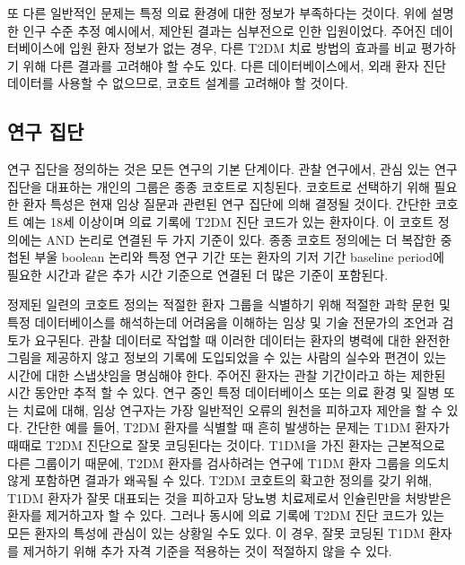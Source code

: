 \documentclass[10.5pt]{book}
\theoremstyle{definition}
\theoremstyle{definition}
\theoremstyle{definition}
\theoremstyle{remark}
\begin{document}
또 다른 일반적인 문제는 특정 의료 환경에 대한 정보가 부족하다는 것이다.
위에 설명한 인구 수준 추정 예시에서, 제안된 결과는 심부전으로 인한
입원이었다. 주어진 데이터베이스에 입원 환자 정보가 없는 경우, 다른 T2DM
치료 방법의 효과를 비교 평가하기 위해 다른 결과를 고려해야 할 수도 있다.
다른 데이터베이스에서, 외래 환자 진단 데이터를 사용할 수 없으므로,
코호트 설계를 고려해야 할 것이다.

\subsection{연구 집단}\label{--1}

연구 집단을 정의하는 것은 모든 연구의 기본 단계이다. 관찰 연구에서, 관심
있는 연구 집단을 대표하는 개인의 그룹은 종종 코호트로 지칭된다. 코호트로
선택하기 위해 필요한 환자 특성은 현재 임상 질문과 관련된 연구 집단에
의해 결정될 것이다. 간단한 코호트 예는 18세 이상이며 의료 기록에 T2DM
진단 코드가 있는 환자이다. 이 코호트 정의에는 AND 논리로 연결된 두 가지
기준이 있다. 종종 코호트 정의에는 더 복잡한 중첩된 부울 boolean 논리와
특정 연구 기간 또는 환자의 기저 기간 baseline period에 필요한 시간과
같은 추가 시간 기준으로 연결된 더 많은 기준이 포함된다.

정제된 일련의 코호트 정의는 적절한 환자 그룹을 식별하기 위해 적절한 과학
문헌 및 특정 데이터베이스를 해석하는데 어려움을 이해하는 임상 및 기술
전문가의 조언과 검토가 요구된다. 관찰 데이터로 작업할 때 이러한 데이터는
환자의 병력에 대한 완전한 그림을 제공하지 않고 정보의 기록에 도입되었을
수 있는 사람의 실수와 편견이 있는 시간에 대한 스냅샷임을 명심해야 한다.
주어진 환자는 관찰 기간이라고 하는 제한된 시간 동안만 추적 할 수 있다.
연구 중인 특정 데이터베이스 또는 의료 환경 및 질병 또는 치료에 대해,
임상 연구자는 가장 일반적인 오류의 원천을 피하고자 제안을 할 수 있다.
간단한 예를 들어, T2DM 환자를 식별할 때 흔히 발생하는 문제는 T1DM 환자가
때때로 T2DM 진단으로 잘못 코딩된다는 것이다. T1DM을 가진 환자는
근본적으로 다른 그룹이기 때문에, T2DM 환자를 검사하려는 연구에 T1DM 환자
그룹을 의도치 않게 포함하면 결과가 왜곡될 수 있다. T2DM 코호트의 확고한
정의를 갖기 위해, T1DM 환자가 잘못 대표되는 것을 피하고자 당뇨병
치료제로서 인슐린만을 처방받은 환자를 제거하고자 할 수 있다. 그러나
동시에 의료 기록에 T2DM 진단 코드가 있는 모든 환자의 특성에 관심이 있는
상황일 수도 있다. 이 경우, 잘못 코딩된 T1DM 환자를 제거하기 위해 추가
자격 기준을 적용하는 것이 적절하지 않을 수 있다.
\end{document}
